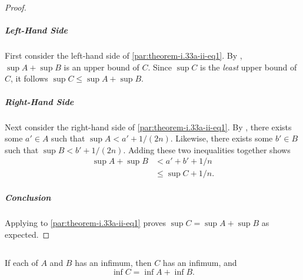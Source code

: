 \documentclass{report}
\begin{document}
\begin{proof}
    \subparagraph{Left-Hand Side}%

      First consider the left-hand side of \eqref{par:theorem-i.33a-ii-eq1}.
      By , $\sup{A} + \sup{B}$ is an upper bound of
        $C$.
      Since $\sup{C}$ is the \textit{least} upper bound of $C$, it follows
        $\sup{C} \leq \sup{A} + \sup{B}$.

    \subparagraph{Right-Hand Side}%

      Next consider the right-hand side of \eqref{par:theorem-i.33a-ii-eq1}.
      By , there exists some $a' \in A$ such that
        $\sup{A} < a' + 1 / (2n)$.
      Likewise, there exists some $b' \in B$ such that
        $\sup{B} < b' + 1 / (2n)$.
      Adding these two inequalities together shows
        \begin{align*}
          \sup{A} + \sup{B}
            & < a' + b' + 1 / n \\
            & \leq \sup{C} + 1 / n.
        \end{align*}

    \subparagraph{Conclusion}%

      Applying  to \eqref{par:theorem-i.33a-ii-eq1}
        proves $\sup{C} = \sup{A} + \sup{B}$ as expected.

\end{proof}

\subsection{}%
\label{sub:theorem-i.33b}

\begin{theorem}[I.33b]

  If each of $A$ and $B$ has an infimum, then $C$ has an infimum, and
    $$\inf{C} = \inf{A} + \inf{B}.$$

\end{theorem}
\end{document}
